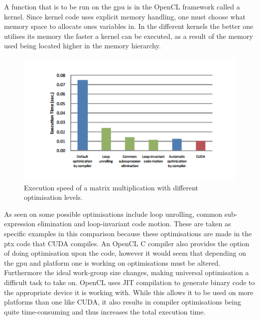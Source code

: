 A function that is to be run on the \acrshort{gpu} is in the OpenCL framework called a kernel.
Since kernel code uses explicit memory handling, one must choose what memory space to allocate ones variables in.
In the different kernels the better one utilises its memory the faster a kernel can be executed, as a result of the memory used being located higher in the memory hierarchy.
\begin{figure}[h!]
\centering
 \includegraphics[width=1\textwidth]{figures/OpenCLOptimisation.png} %
\caption{Execution speed of a matrix multiplication with different optimisation levels. \citep{CUDAOpenCLOptimisation}}\label{image:OpenCLOptCompare}
\vspace{-15pt}
\end{figure}
As seen on  some possible optimisations include loop unrolling, common sub-expression elimination and loop-invariant code motion. 
These are taken as specific examples in this comparison because these optimisations are made in the \acrlong{ptx} code that CUDA compiles.
An OpenCL C compiler also provides the option of doing optimisation upon the code, however it would seem that depending on the \acrshort{gpu} and platform one is working on optimisations must be altered.
Furthermore the ideal work-group size changes, making universal optimisation a difficult task to take on.
OpenCL uses JIT compilation to generate binary code to the appropriate device it is working with.
While this allows it to be used on more platforms than one like CUDA, it also results in compiler optimisations being quite time-consuming and thus increases the total execution time.\citep{CUDAOpenCLOptimisation}
